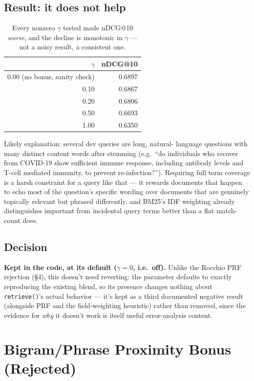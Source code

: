 \documentclass[11pt]{article}
\begin{document}
\subsection{Result: it does not help}
\begin{table}[h]
\centering
\begin{tabular}{rr}
\toprule
$\gamma$ & nDCG@10 \\
\midrule
0.00 (no bonus, sanity check) & 0.6897 \\
0.10 & 0.6867 \\
0.20 & 0.6806 \\
0.50 & 0.6693 \\
1.00 & 0.6350 \\
\bottomrule
\end{tabular}
\caption{Every nonzero $\gamma$ tested made nDCG@10 \emph{worse}, and the
decline is monotonic in $\gamma$ --- not a noisy result, a consistent
one.}
\end{table}

\noindent Likely explanation: several dev queries are long, natural-
language questions with many distinct content words after stemming
(e.g.\ ``do individuals who recover from COVID-19 show sufficient immune
response, including antibody levels and T-cell mediated immunity, to
prevent re-infection?''). Requiring full term coverage is a harsh
constraint for a query like that --- it rewards documents that happen to
echo most of the question's specific wording over documents that are
genuinely topically relevant but phrased differently, and BM25's IDF
weighting already distinguishes important from incidental query terms
better than a flat match-count does.

\subsection{Decision}
\textbf{Kept in the code, at its default (}$\gamma{=}0${\textbf{, i.e.\ off).}}
Unlike the Rocchio PRF rejection (\S 4), this doesn't need reverting: the
parameter defaults to exactly reproducing the existing blend, so its
presence changes nothing about \texttt{retrieve()}'s actual behavior ---
it's kept as a third documented negative result (alongside PRF and the
field-weighting heuristic) rather than removed, since the evidence for
\emph{why} it doesn't work is itself useful error-analysis content.

\section{Bigram/Phrase Proximity Bonus (Rejected)}
\end{document}

